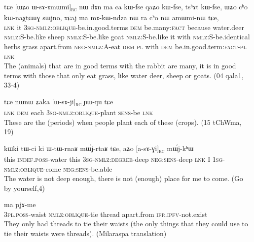 \documentclass[oldfontcommands,oneside,a4paper,11pt]{article}
\newcommand{\ipa}[1]{{\phon #1}} %
\newcommand{\topic}{\textsc{dem}}
\newcommand{\rc}{\textsubscript{\textsc{rc}}}
\begin{document}
\begin{exe}
   \ex \label{ex:WsAmWmi}
 \gll 
\ipa{tɕe}   	[\ipa{ɯʑo}   	\ipa{ɯ-sɤ-ɤmɯmi}]\rc{}   	\ipa{nɯ}   	\ipa{dɤn}   	\ipa{ma}   	\ipa{ca}   	\ipa{kɯ-fse}   	\ipa{qaʑo}   	\ipa{kɯ-fse,}   	\ipa{tsʰɤt}   	\ipa{kɯ-fse,}   	 \ipa{ɯʑo}   	\ipa{cʰo}   	\ipa{kɯ-naχtɕɯɣ}   	\ipa{sɯjno,}   	\ipa{xɕaj}   	\ipa{ma}   	\ipa{mɤ-kɯ-ndza}   	\ipa{nɯ} \ipa{ra}   	\ipa{cʰo}   	\ipa{nɯ}   	\ipa{amɯmi-nɯ}   	\ipa{tɕe,}   \\
\textsc{lnk} it \textsc{3sg-nmlz:oblique}-be.in.good.terms \topic{} be.many:\textsc{fact} because water.deer \textsc{nmlz:S}-be.like sheep \textsc{nmlz:S}-be.like goat  \textsc{nmlz:S}-be.like it with  \textsc{nmlz:S}-be.identical herbs grass apart.from \textsc{neg-nmlz:A}-eat \textsc{dem} \textsc{pl} with \textsc{dem} be.in.good.term:\textsc{fact}-\textsc{pl} \textsc{lnk} \\
\glt The (animals) that are in good terms with the rabbit are many, it is in good terms with those that only eat grass, like water deer, sheep or goats. (04 qala1, 33-4)
\end{exe}

\begin{exe}
   \ex \label{ex:WsAji}
   \gll
   \ipa{tɕe} 	\ipa{nɯnɯ} 	\ipa{ʑaka} 	[\ipa{ɯ-sɤ-ji}]\rc{} 	\ipa{ɲɯ-ŋu} 	\ipa{tɕe}\\
   \textsc{lnk} \textsc{dem} each \textsc{3sg-nmlz:oblique}-plant \textsc{sens}-be \textsc{lnk}\\
\glt These are the (periods) when people plant each of these (crops). (15 tChWma, 19)
\end{exe}

\begin{exe}
   \ex \label{ex:asAGi}
 \gll
\ipa{kɯki}   	\ipa{tɯ-ci}   	\ipa{ki}   	\ipa{ɯ-tɯ-rnaʁ}   	\ipa{mɯ́j-rtaʁ}   	\ipa{tɕe,}   	\ipa{aʑo}   	[\ipa{a-sɤ-ɣi}]\rc{}   	\ipa{mɯ́j-kʰɯ}   \\
this \textsc{indef.poss}-water this \textsc{3sg-nmlz:degree}-deep \textsc{neg:sens}-deep \textsc{lnk} I \textsc{1sg-nmlz:oblique}-come \textsc{neg:sens}-be.able \\
\glt The water is not deep enough, there is not (enough) place for me to come. (Go by yourself,4)
\end{exe}


 \begin{exe}
  \ex  \label{ex:sAxtCAr}  
  \gll [\ipa{nɯ-mtʰɤɣ}  	\ipa{sɤ-xtɕɤr}]  	\ipa{xɕɤfsa}  	\ipa{ma}  	\ipa{pjɤ-me}  \\
\textsc{3pl.poss}-waist \textsc{nmlz:oblique}-tie thread apart.from \textsc{ifr.ipfv}-not.exist \\
\glt They only had threads to tie their waists (the only things that they could use to tie their waists were threads). (Milaraspa translation)
   \end{exe} 
\end{document}
